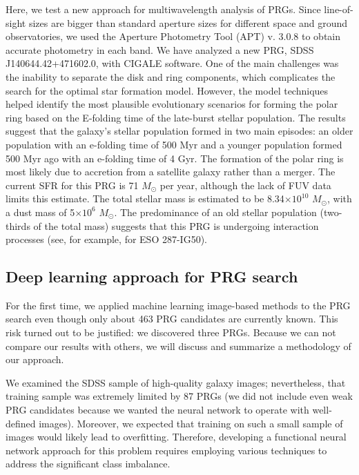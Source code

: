 \documentclass{aa}
\begin{document}
Here, we test a new approach for multiwavelength analysis of PRGs. Since line-of-sight sizes are bigger than standard aperture sizes for different space and ground observatories, we used the Aperture Photometry Tool (APT) v. 3.0.8 \cite{Laher2012} to obtain accurate photometry in each band. We have analyzed a new PRG, SDSS J140644.42+471602.0, with CIGALE software. One of the main challenges was the inability to separate the disk and ring components, which complicates the search for the optimal star formation model. However, the model techniques helped identify the most plausible evolutionary scenarios for forming the polar ring based on the E-folding time of the late-burst stellar population. The results suggest that the galaxy’s stellar population formed in two main episodes: an older population with an e-folding time of 500 Myr and a younger population formed 500 Myr ago with an e-folding time of 4 Gyr. The formation of the polar ring is most likely due to accretion from a satellite galaxy rather than a merger.  The current SFR for this PRG is 71 $M_{\odot}$ per year, although the lack of FUV data limits this estimate. The total stellar mass is estimated to be 8.34$\times 10^{10}$ $M_{\odot}$, with a dust mass of 5$\times 10^{6}$ $M_{\odot}$. The predominance of an old stellar population (two-thirds of the total mass) suggests that this PRG is undergoing interaction processes (see, for example, \cite{Freitas2024} for ESO 287-IG50). 

\subsection{Deep learning approach for PRG search}

For the first time, we applied machine learning image-based methods to the PRG search even though only about 463 PRG candidates are currently known. This risk turned out to be justified: we discovered three PRGs. Because we can not compare our results with others, we will discuss and summarize a methodology of our approach. 

We examined the SDSS sample of high-quality galaxy images; nevertheless, that training sample was extremely limited by 87 PRGs (we did not include even weak PRG candidates because we wanted the neural network to operate with well-defined images). Moreover, we expected that training on such a small sample of images would likely lead to overfitting. Therefore, developing a functional neural network approach for this problem requires employing various techniques to address the significant class imbalance. 
\end{document}
